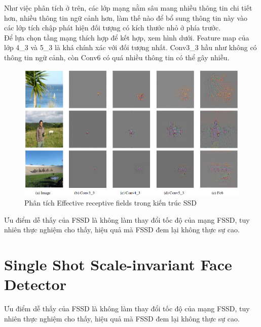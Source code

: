 \documentclass[a4paper]{report}
\begin{document}
Như việc phân tích ở trên, các lớp mạng nằm sâu mang nhiều thông tin chi tiết hơn, nhiều thông tin ngữ cảnh hơn, làm thế nào để bổ sung thông tin này vào các lớp tích chập phát hiện đối tượng có kích thước nhỏ ở phía trước. 
\\

Để lựa chọn tầng mạng thích hợp để kết hợp, xem hình dưới. Feature map của lớp 4\_3 và 5\_3 là khá chính xác với đối tượng nhất. Conv3\_3 hầu như không có thông tin ngữ cảnh, còn Conv6 có quá nhiều thông tin có thể gây nhiễu. 
\\

\begin{figure}[h!]
	\centering
	\includegraphics[width=1\textwidth]{3_conv_ef.png}
	\caption[Caption for LOF]{Phân tích Effective receptive fields trong kiến trúc SSD}
\end{figure}

Ưu điểm dễ thấy của FSSD là không làm thay đổi tốc độ của mạng FSSD, tuy nhiên thực nghiệm cho thấy, hiệu quả mà FSSD đem lại không thực sự cao.

\section{Single Shot Scale-invariant Face Detector }
Ưu điểm dễ thấy của FSSD là không làm thay đổi tốc độ của mạng FSSD, tuy nhiên thực nghiệm cho thấy, hiệu quả mà FSSD đem lại không thực sự cao.
\\
\end{document}

